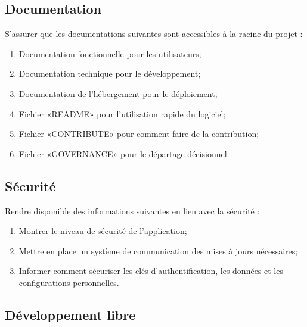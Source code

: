\subsection{Documentation}

S'assurer que les documentations suivantes sont accessibles à la racine du projet :
\begin{enumerate}
    \item Documentation fonctionnelle pour les utilisateurs;
    \item Documentation technique pour le développement;
    \item Documentation de l'hébergement pour le déploiement;
    \item Fichier «README» pour l'utilisation rapide du logiciel;
    \item Fichier «CONTRIBUTE» pour comment faire de la contribution;
    \item Fichier «GOVERNANCE» pour le départage décisionnel.
\end{enumerate}

\subsection{Sécurité}

Rendre disponible des informations suivantes en lien avec la sécurité : 
\begin{enumerate}
    \item Montrer le niveau de sécurité de l'application;
    \item Mettre en place un système de communication des mises à jours nécessaires;
    \item Informer comment sécuriser les clés d'authentification, les données et les configurations personnelles.
\end{enumerate}

\subsection{Développement libre}

